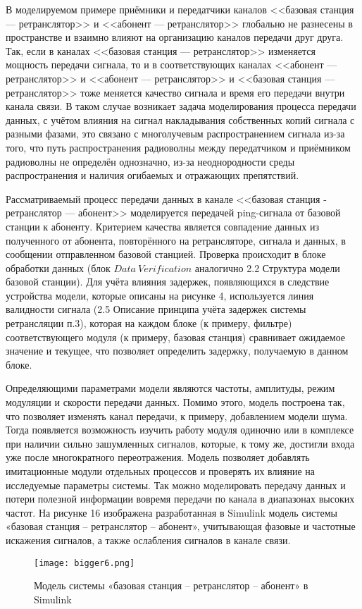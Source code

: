\begin{onehalfspace}
    В моделируемом примере приёмники и передатчики каналов <<базовая станция — ретранслятор>> и <<абонент — ретранслятор>> глобально не разнесены в пространстве и взаимно влияют на организацию каналов передачи друг друга. Так, если в каналах <<базовая станция — ретранслятор>> изменяется мощность передачи сигнала, то  и  в соответствующих каналах  <<абонент — ретранслятор>> и  <<абонент — ретранслятор>>  и <<базовая станция — ретранслятор>> тоже меняется качество сигнала и время его передачи внутри канала связи. В таком случае возникает задача моделирования процесса передачи данных, с учётом влияния на сигнал накладывания собственных копий сигнала с разными фазами, это связано с многолучевым распространением сигнала из-за того, что путь распространения радиоволны между передатчиком и приёмником радиоволны не определён однозначно, из-за неоднородности среды распространения и наличия огибаемых и отражающих препятствий.



    Рассматриваемый процесс передачи данных в канале <<базовая станция - ретранслятор — абонент>> моделируется передачей ping-сигнала от базовой станции к абоненту. Критерием качества является совпадение данных из полученного от абонента, повторённого на ретрансляторе, сигнала и данных, в сообщении отправленном базовой станцией. Проверка происходит в блоке обработки данных (блок $Data \ Verification$ аналогично 2.2 Структура модели базовой станции). Для учёта влияния задержек, появляющихся в следствие устройства модели, которые описаны на рисунке 4, используется линия валидности сигнала (2.5 Описание принципа учёта задержек системы ретрансляции п.3), которая на каждом блоке (к примеру, фильтре) соответствующего модуля (к примеру, базовая станция) сравнивает ожидаемое значение и текущее, что позволяет определить задержку, получаемую в данном блоке. 
    

    Определяющими параметрами модели являются частоты, амплитуды, режим модуляции и скорости передачи данных. Помимо этого, модель построена так, что позволяет изменять канал передачи, к примеру, добавлением модели шума. Тогда появляется возможность изучить работу модуля одиночно или в комплексе при наличии сильно зашумленных сигналов, которые, к тому же, достигли входа уже после многократного переотражения. Модель позволяет добавлять имитационные модули отдельных процессов и проверять их влияние на исследуемые параметры системы. Так можно моделировать передачу данных и потери полезной информации вовремя передачи по канала в диапазонах высоких частот. На рисунке 16 изображена разработанная в Simulink модель системы «базовая станция – ретранслятор – абонент», учитывающая фазовые и частотные искажения сигналов, а также ослабления сигналов в канале связи.

 \begin{figure}[h!]
\centering
\texttt{[image: bigger6.png]}
\caption{Модель системы «базовая станция – ретранслятор – абонент» в Simulink}
\label{fig:model22}
\end{figure}


\end{onehalfspace}

